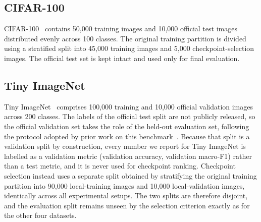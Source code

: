\documentclass[runningheads]{llncs}
\begin{document}
\subsection{CIFAR-100}

CIFAR-100~\cite{krizhevsky2009learning} contains 50,000 training images and
10,000 official test images distributed evenly across 100 classes. The original
training partition is divided using a stratified split into 45,000 training
images and 5,000 checkpoint-selection images. The official test set is kept
intact and used only for final evaluation.

\subsection{Tiny ImageNet}

Tiny ImageNet~\cite{le2015tiny} comprises 100,000 training and 10,000 official
validation images across 200 classes. The labels of the official test split are
not publicly released, so the official validation set takes the role of the
held-out evaluation set, following the protocol adopted by prior work on this
benchmark~\cite{abai2019densenet,huynh2022vision}. Because that split is a
validation split by construction, every number we report for Tiny ImageNet is
labelled as a validation metric (validation accuracy, validation macro-F1)
rather than a test metric, and it is never used for checkpoint ranking.
Checkpoint selection instead uses a separate split obtained by stratifying the
original training partition into 90,000 local-training images and 10,000
local-validation images, identically across all experimental setups. The two
splits are therefore disjoint, and the evaluation split remains unseen by the
selection criterion exactly as for the other four datasets.
\FloatBarrier

\end{document}
